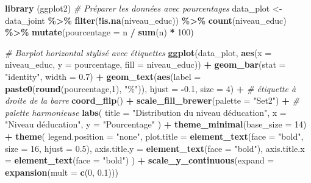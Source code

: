 \documentclass[
]{article}
\newenvironment{Shaded}{\begin{snugshade}}{\end{snugshade}}
\newcommand{\AttributeTok}[1]{\textcolor[rgb]{0.13,0.29,0.53}{#1}}
\newcommand{\CommentTok}[1]{\textcolor[rgb]{0.56,0.35,0.01}{\textit{#1}}}
\newcommand{\DecValTok}[1]{\textcolor[rgb]{0.00,0.00,0.81}{#1}}
\newcommand{\FloatTok}[1]{\textcolor[rgb]{0.00,0.00,0.81}{#1}}
\newcommand{\FunctionTok}[1]{\textcolor[rgb]{0.13,0.29,0.53}{\textbf{#1}}}
\newcommand{\NormalTok}[1]{#1}
\newcommand{\OtherTok}[1]{\textcolor[rgb]{0.56,0.35,0.01}{#1}}
\newcommand{\SpecialCharTok}[1]{\textcolor[rgb]{0.81,0.36,0.00}{\textbf{#1}}}
\newcommand{\StringTok}[1]{\textcolor[rgb]{0.31,0.60,0.02}{#1}}
\begin{document}
\begin{Shaded}
\begin{Highlighting}[]
\FunctionTok{library}\NormalTok{ (ggplot2)}
\CommentTok{\# Préparer les données avec pourcentages}
\NormalTok{data\_plot }\OtherTok{\textless{}{-}}\NormalTok{ data\_joint }\SpecialCharTok{\%\textgreater{}\%}
  \FunctionTok{filter}\NormalTok{(}\SpecialCharTok{!}\FunctionTok{is.na}\NormalTok{(niveau\_educ)) }\SpecialCharTok{\%\textgreater{}\%}
  \FunctionTok{count}\NormalTok{(niveau\_educ) }\SpecialCharTok{\%\textgreater{}\%}
  \FunctionTok{mutate}\NormalTok{(}\AttributeTok{pourcentage =}\NormalTok{ n }\SpecialCharTok{/} \FunctionTok{sum}\NormalTok{(n) }\SpecialCharTok{*} \DecValTok{100}\NormalTok{)}

\CommentTok{\# Barplot horizontal stylisé avec étiquettes}
\FunctionTok{ggplot}\NormalTok{(data\_plot, }\FunctionTok{aes}\NormalTok{(}\AttributeTok{x =}\NormalTok{ niveau\_educ, }\AttributeTok{y =}\NormalTok{ pourcentage, }\AttributeTok{fill =}\NormalTok{ niveau\_educ)) }\SpecialCharTok{+}
  \FunctionTok{geom\_bar}\NormalTok{(}\AttributeTok{stat =} \StringTok{"identity"}\NormalTok{, }\AttributeTok{width =} \FloatTok{0.7}\NormalTok{) }\SpecialCharTok{+}
  \FunctionTok{geom\_text}\NormalTok{(}\FunctionTok{aes}\NormalTok{(}\AttributeTok{label =} \FunctionTok{paste0}\NormalTok{(}\FunctionTok{round}\NormalTok{(pourcentage,}\DecValTok{1}\NormalTok{), }\StringTok{"\%"}\NormalTok{)),}
            \AttributeTok{hjust =} \SpecialCharTok{{-}}\FloatTok{0.1}\NormalTok{, }\AttributeTok{size =} \DecValTok{4}\NormalTok{) }\SpecialCharTok{+}  \CommentTok{\# étiquette à droite de la barre}
  \FunctionTok{coord\_flip}\NormalTok{() }\SpecialCharTok{+}
  \FunctionTok{scale\_fill\_brewer}\NormalTok{(}\AttributeTok{palette =} \StringTok{"Set2"}\NormalTok{) }\SpecialCharTok{+}  \CommentTok{\# palette harmonieuse}
  \FunctionTok{labs}\NormalTok{(}
    \AttributeTok{title =} \StringTok{"Distribution du niveau d\textquotesingle{}éducation"}\NormalTok{,}
    \AttributeTok{x =} \StringTok{"Niveau d\textquotesingle{}éducation"}\NormalTok{,}
    \AttributeTok{y =} \StringTok{"Pourcentage"}
\NormalTok{  ) }\SpecialCharTok{+}
  \FunctionTok{theme\_minimal}\NormalTok{(}\AttributeTok{base\_size =} \DecValTok{14}\NormalTok{) }\SpecialCharTok{+}
  \FunctionTok{theme}\NormalTok{(}
    \AttributeTok{legend.position =} \StringTok{"none"}\NormalTok{,}
    \AttributeTok{plot.title =} \FunctionTok{element\_text}\NormalTok{(}\AttributeTok{face =} \StringTok{"bold"}\NormalTok{, }\AttributeTok{size =} \DecValTok{16}\NormalTok{, }\AttributeTok{hjust =} \FloatTok{0.5}\NormalTok{),}
    \AttributeTok{axis.title.y =} \FunctionTok{element\_text}\NormalTok{(}\AttributeTok{face =} \StringTok{"bold"}\NormalTok{),}
    \AttributeTok{axis.title.x =} \FunctionTok{element\_text}\NormalTok{(}\AttributeTok{face =} \StringTok{"bold"}\NormalTok{)}
\NormalTok{  ) }\SpecialCharTok{+}
  \FunctionTok{scale\_y\_continuous}\NormalTok{(}\AttributeTok{expand =} \FunctionTok{expansion}\NormalTok{(}\AttributeTok{mult =} \FunctionTok{c}\NormalTok{(}\DecValTok{0}\NormalTok{, }\FloatTok{0.1}\NormalTok{)))}
\end{Highlighting}
\end{Shaded}
\end{document}
